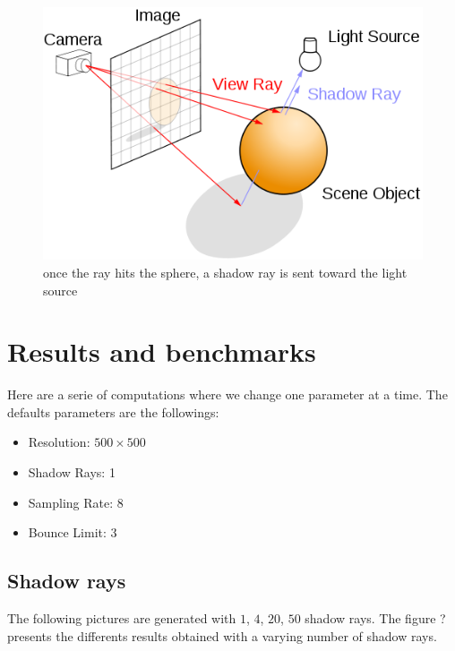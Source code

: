 \documentclass[12pt]{article}
\numberwithin{equation}{section}
\begin{document}
\begin{figure}
  \begin{center}
    \includegraphics[scale=0.5]{500px-Ray_trace_diagram.png}
    \caption{once the ray hits the sphere, a shadow ray is sent toward the light source}
    \label{fig:4}
  \end{center}
\end{figure}

\section{Results and benchmarks}
Here are a serie of computations where we change one parameter at a time. The defaults parameters are the followings:
\begin{itemize}
\item Resolution: $500 \times 500$
\item Shadow Rays: 1
\item Sampling Rate: 8
\item Bounce Limit: 3

\end{itemize}
\subsection{Shadow rays}

The following pictures are generated with $1$, $4$, $20$, $50$ shadow rays. The figure ? presents the differents results obtained with a varying number of shadow rays.\\
\end{document}
